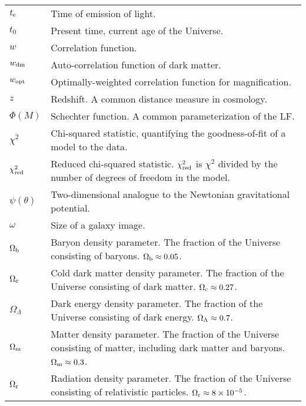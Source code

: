 \begin{tabular}{p{0.6in}p{5.8in}}
$t_{\rm e}$ & Time of emission of light. \\
$t_0$ & Present time, current age of the Universe. \\
$w$ & Correlation function. \\
$w_{\rm dm}$ & Auto-correlation function of dark matter. \\
$w_{\rm opt}$ & Optimally-weighted correlation function for magnification. \\
$z$ & Redshift. A common distance measure in cosmology. \\
$\Phi(M)$ & Schechter function. A common parameterization of the \acs{LF}. \\
$\chi^2$ & Chi-squared statistic, quantifying the goodness-of-fit of a model to the data. \\
$\chi^2_{\rm red}$ & Reduced chi-squared statistic. $\chi^2_{\rm red}$ is $\chi^2$ divided by the number of degrees of freedom in the model. \\
$\psi(\theta)$ & Two-dimensional analogue to the Newtonian gravitational potential. \\
$\omega$ & Size of a galaxy image. \\
$\Omega_{\rm b}$ & Baryon density parameter. The fraction of the Universe consisting of baryons. $\Omega_{\rm b} \approx 0.05$. \\
$\Omega_{\rm c}$ & Cold dark matter density parameter. The fraction of the Universe consisting of dark matter. $\Omega_{\rm c} \approx 0.27$. \\
$\Omega_{\Lambda}$ & Dark energy density parameter. The fraction of the Universe consisting of dark energy. $\Omega_{\rm \Lambda} \approx 0.7$. \\
$\Omega_{\rm m}$ & Matter density parameter. The fraction of the Universe consisting of matter, including dark matter and baryons. $\Omega_{\rm m} \approx 0.3$. \\
$\Omega_{\rm r}$ & Radiation density parameter. The fraction of the Universe consisting of relativistic particles. $\Omega_{\rm r} \approx 8 \times 10^{-5}$. \\

\end{tabular}



% 
